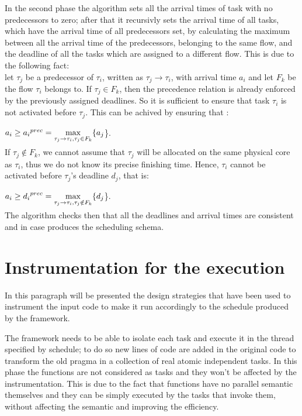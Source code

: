 \documentclass[a4paper,11pt,oneside]{book}
\begin{document}
In the second phase the algorithm sets all the arrival times of task with no predecessors to zero; after that it recursivly sets the arrival time of all tasks, which have the arrival time of all predecessors set, by calculating the maximum between all the arrival time of the predecessors, belonging to the same flow, and the deadline of all the tasks which are assigned to a different flow. This is due to the following fact: \\
let $\tau_j$ be a predecessor of $\tau_i$, written as $\tau_j \rightarrow \tau_i$, with arrival time $a_i$ and let $F_k$ be the flow $\tau_i$ belongs to. If $\tau_j \in F_k$, then the precedence relation is already enforced by the previously assigned deadlines. So it is sufficient to ensure that task $\tau_i$ is not activated before $\tau_j$. This can be achived by ensuring that :
\begin{center}$ a_i \ge  {a_i}^{prec} = \smash{\displaystyle\max_{\tau_j \rightarrow \tau_i,\tau_j \in F_k} }\{a_j$\}.\end{center}
If $\tau_j \notin F_k$, we cannot assume that $\tau_j$ will be allocated on the same physical core as $\tau_i$, thus we do not know its precise finishing time. Hence, $\tau_i$ cannot be activated before $\tau_j$'s deadline $d_j$, that is:
\begin{center}$ a_i \ge  {d_i}^{prec} = \smash{\displaystyle\max_{\tau_j \rightarrow \tau_i,\tau_j \notin F_k} }\{d_j$\}.\end{center}
The algorithm checks then that all the deadlines and arrival times are consistent and in case produces the scheduling schema.

\section{Instrumentation for the execution}

In this paragraph will be presented the design strategies that have been used to instrument the input code to make it run accordingly to the schedule produced by the framework. 

The framework needs to be able to isolate each task and execute it in the thread specified by schedule; to do so new lines of code are added in the original code to transform the old pragma in a collection of real atomic independent tasks. In this phase the functions are not considered as tasks and they won’t be affected by the instrumentation. This is due to the fact that functions have no parallel semantic themselves and they can be simply executed by the tasks that invoke them, without affecting the semantic and improving the efficiency.
\end{document}
